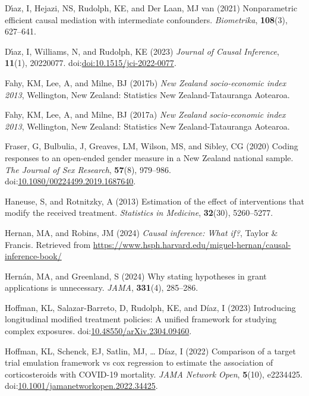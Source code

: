 \documentclass[
  single column]{article}
\newlength{\cslhangindent}
\newenvironment{CSLReferences}[2] %
 {\begin{list}{}{%
  \setlength{\itemindent}{0pt}
  \setlength{\leftmargin}{0pt}
  \setlength{\parsep}{0pt}
  \ifodd #1
   \setlength{\leftmargin}{\cslhangindent}
   \setlength{\itemindent}{-1\cslhangindent}
  \fi
  \setlength{\itemsep}{#2\baselineskip}}}
 {\end{list}}
\begin{document}
\begin{CSLReferences}{1}{0}
Dı́az, I, Hejazi, NS, Rudolph, KE, and Der Laan, MJ van (2021)
Nonparametric efficient causal mediation with intermediate confounders.
\emph{Biometrika}, \textbf{108}(3), 627--641.

Dı́az, I, Williams, N, and Rudolph, KE (2023) \emph{Journal of Causal
Inference}, \textbf{11}(1), 20220077.
doi:\href{https://doi.org/doi:10.1515/jci-2022-0077}{doi:10.1515/jci-2022-0077}.

Fahy, KM, Lee, A, and Milne, BJ (2017b) \emph{New Zealand socio-economic
index 2013}, Wellington, New Zealand: Statistics New Zealand-Tatauranga
Aotearoa.

Fahy, KM, Lee, A, and Milne, BJ (2017a) \emph{New Zealand socio-economic
index 2013}, Wellington, New Zealand: Statistics New Zealand-Tatauranga
Aotearoa.

Fraser, G, Bulbulia, J, Greaves, LM, Wilson, MS, and Sibley, CG (2020)
Coding responses to an open-ended gender measure in a {N}ew {Z}ealand
national sample. \emph{The Journal of Sex Research}, \textbf{57}(8),
979--986.
doi:\href{https://doi.org/10.1080/00224499.2019.1687640}{10.1080/00224499.2019.1687640}.

Haneuse, S, and Rotnitzky, A (2013) Estimation of the effect of
interventions that modify the received treatment. \emph{Statistics in
Medicine}, \textbf{32}(30), 5260--5277.

Hernan, MA, and Robins, JM (2024) \emph{Causal inference: What if?},
Taylor \& Francis. Retrieved from
\url{https://www.hsph.harvard.edu/miguel-hernan/causal-inference-book/}

Hernán, MA, and Greenland, S (2024) Why stating hypotheses in grant
applications is unnecessary. \emph{JAMA}, \textbf{331}(4), 285--286.

Hoffman, KL, Salazar-Barreto, D, Rudolph, KE, and Díaz, I (2023)
Introducing longitudinal modified treatment policies: A unified
framework for studying complex exposures.
doi:\href{https://doi.org/10.48550/arXiv.2304.09460}{10.48550/arXiv.2304.09460}.

Hoffman, KL, Schenck, EJ, Satlin, MJ, \ldots{} Díaz, I (2022) Comparison
of a target trial emulation framework vs cox regression to estimate the
association of corticosteroids with COVID-19 mortality. \emph{JAMA
Network Open}, \textbf{5}(10), e2234425.
doi:\href{https://doi.org/10.1001/jamanetworkopen.2022.34425}{10.1001/jamanetworkopen.2022.34425}.


\end{CSLReferences}
\end{document}
